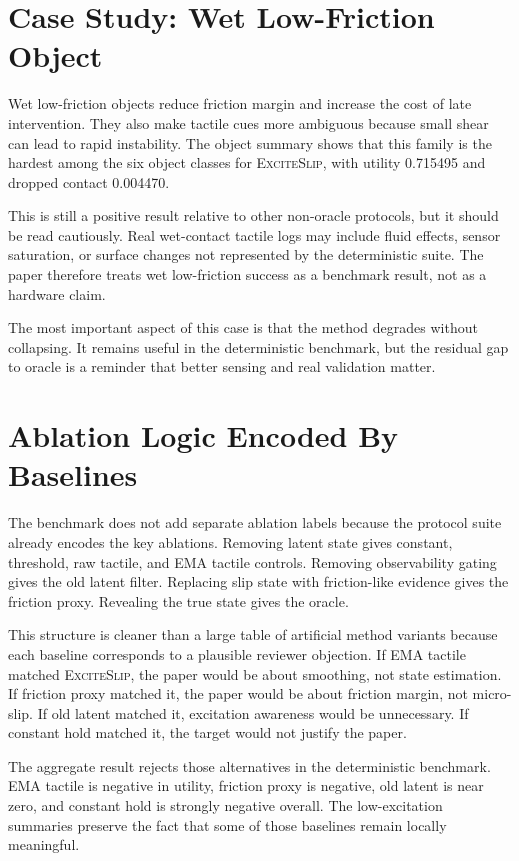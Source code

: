 \documentclass{article}
\newcommand{\method}{\textsc{ExciteSlip}\xspace}
\begin{document}
\section{Case Study: Wet Low-Friction Object}

Wet low-friction objects reduce friction margin and increase the cost of late intervention. They also make tactile cues more ambiguous because small shear can lead to rapid instability. The object summary shows that this family is the hardest among the six object classes for \method, with utility 0.715495 and dropped contact 0.004470.

This is still a positive result relative to other non-oracle protocols, but it should be read cautiously. Real wet-contact tactile logs may include fluid effects, sensor saturation, or surface changes not represented by the deterministic suite. The paper therefore treats wet low-friction success as a benchmark result, not as a hardware claim.

The most important aspect of this case is that the method degrades without collapsing. It remains useful in the deterministic benchmark, but the residual gap to oracle is a reminder that better sensing and real validation matter.

\section{Ablation Logic Encoded By Baselines}

The benchmark does not add separate ablation labels because the protocol suite already encodes the key ablations. Removing latent state gives constant, threshold, raw tactile, and EMA tactile controls. Removing observability gating gives the old latent filter. Replacing slip state with friction-like evidence gives the friction proxy. Revealing the true state gives the oracle.

This structure is cleaner than a large table of artificial method variants because each baseline corresponds to a plausible reviewer objection. If EMA tactile matched \method, the paper would be about smoothing, not state estimation. If friction proxy matched it, the paper would be about friction margin, not micro-slip. If old latent matched it, excitation awareness would be unnecessary. If constant hold matched it, the target would not justify the paper.

The aggregate result rejects those alternatives in the deterministic benchmark. EMA tactile is negative in utility, friction proxy is negative, old latent is near zero, and constant hold is strongly negative overall. The low-excitation summaries preserve the fact that some of those baselines remain locally meaningful.
\end{document}
